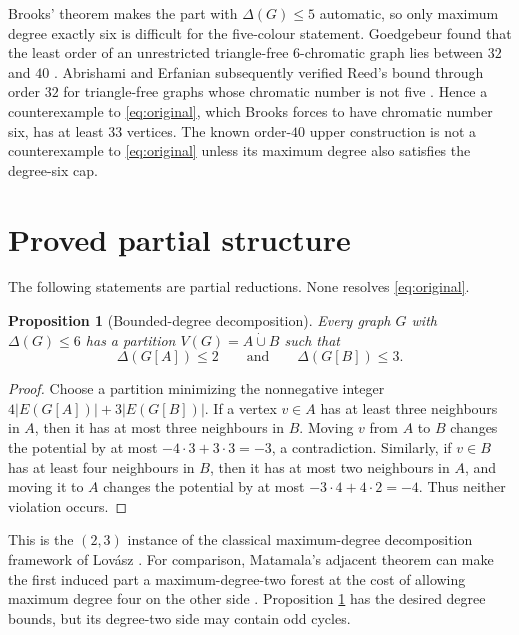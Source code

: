 \documentclass[11pt]{amsart}
\newtheorem{proposition}{Proposition}[section]
\theoremstyle{definition}
\begin{document}
Brooks' theorem \cite{Brooks1941} makes the part with $\Delta(G)\leq5$
automatic, so only maximum degree exactly six is difficult for the
five-colour statement.  Goedgebeur found that the least order of an
unrestricted triangle-free $6$-chromatic graph lies between $32$ and $40$
\cite{Goedgebeur2020}.  Abrishami and Erfanian subsequently verified Reed's
bound through order $32$ for triangle-free graphs whose chromatic number is
not five \cite{AbrishamiErfanian2023}.  Hence a counterexample to
\eqref{eq:original}, which Brooks forces to have chromatic number six, has at
least $33$ vertices.  The known order-$40$ upper construction is not a
counterexample to \eqref{eq:original} unless its maximum degree also satisfies
the degree-six cap.

\section{Proved partial structure}

The following statements are partial reductions.  None resolves
\eqref{eq:original}.

\begin{proposition}[Bounded-degree decomposition]\label{prop:decomposition}
Every graph $G$ with $\Delta(G)\leq6$ has a partition
$V(G)=A\mathbin{\dot\cup}B$ such that
\[
  \Delta(G[A])\leq2
  \qquad\text{and}\qquad
  \Delta(G[B])\leq3.
\]
\end{proposition}

\begin{proof}
Choose a partition minimizing the nonnegative integer
$4|E(G[A])|+3|E(G[B])|$.  If a vertex $v\in A$ has at least three neighbours
in $A$, then it has at most three neighbours in $B$.  Moving $v$ from $A$ to
$B$ changes the potential by at most $-4\cdot3+3\cdot3=-3$, a contradiction.
Similarly, if $v\in B$ has at least four neighbours in $B$, then it has at
most two neighbours in $A$, and moving it to $A$ changes the potential by at
most $-3\cdot4+4\cdot2=-4$.  Thus neither violation occurs.
\end{proof}

This is the $(2,3)$ instance of the classical maximum-degree decomposition
framework of Lov\'asz \cite{Lovasz1966}.  For comparison, Matamala's adjacent
theorem can make the first induced part a maximum-degree-two forest at the
cost of allowing maximum degree four on the other side
\cite{Matamala2007}.  Proposition \ref{prop:decomposition} has the desired
degree bounds, but its degree-two side may contain odd cycles.
\end{document}
